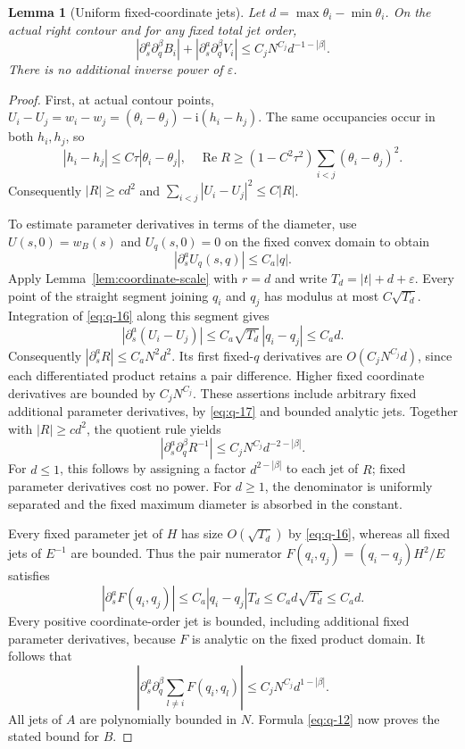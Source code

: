 \documentclass[11pt]{article}
\numberwithin{equation}{section}
\newtheorem{lemma}[theorem]{Lemma}
\theoremstyle{remark}\newtheorem{remark}[theorem]{Remark}
\newcommand{\ii}{\mathrm i}
\newcommand{\Rea}{\operatorname{Re}}
\begin{document}
\begin{lemma}[Uniform fixed-coordinate jets]\label{lem:jets}
Let $d=\max\theta_i-\min\theta_i$. On the actual right contour and
for any fixed total jet order,
\begin{equation}\label{eq:q-14}
|\partial_s^a\partial_q^\beta B_i|
  +|\partial_s^a\partial_q^\beta V_i|
 \le C_j N^{C_j}d^{-1-|\beta|}.
\end{equation}
There is no additional inverse power of $\varepsilon$.
\end{lemma}
\begin{proof}
First, at actual contour points,
$U_i-U_j=w_i-w_j=(\theta_i-\theta_j)-\ii(h_i-h_j)$.
The same occupancies occur in both $h_i,h_j$, so
\begin{equation}\label{eq:q-15}
|h_i-h_j|\le C\tau|\theta_i-\theta_j|,
 \quad \Rea R\ge(1-C^2\tau^2)\sum_{i<j}(\theta_i-\theta_j)^2.
\end{equation}
Consequently $|R|\ge c d^2$ and
$\sum_{i<j}|U_i-U_j|^2\le C|R|$.

To estimate parameter derivatives in terms of the diameter, use
$U(s,0)=w_B(s)$ and $U_q(s,0)=0$ on the fixed convex domain to obtain
\begin{equation}\label{eq:q-16}
 |\partial_s^a U_q(s,q)|\le C_a|q|.
\end{equation}
Apply Lemma~\ref{lem:coordinate-scale} with $r=d$ and write
$T_d=|t|+d+\varepsilon$. Every point of the straight segment
joining $q_i$ and $q_j$ has modulus at most $C\sqrt{T_d}$.
Integration of \eqref{eq:q-16} along this segment gives
\begin{equation}\label{eq:q-17}
 |\partial_s^a(U_i-U_j)|
 \le C_a\sqrt{T_d}\,|q_i-q_j|\le C_a d.
\end{equation}
Consequently $|\partial_s^aR|\le C_aN^2d^2$.
Its first fixed-$q$ derivatives are $O(C_jN^{C_j}d)$, since
each differentiated product retains a pair difference.
Higher fixed coordinate derivatives are bounded by $C_jN^{C_j}$.
These assertions include arbitrary fixed additional parameter
derivatives, by \eqref{eq:q-17} and bounded analytic jets.
Together with $|R|\ge cd^2$, the quotient rule yields
\[
 |\partial_s^a\partial_q^\beta R^{-1}|
       \le C_jN^{C_j}d^{-2-|\beta|}.
\]
For $d\le1$, this follows by assigning a factor
$d^{2-|\beta|}$ to each jet of $R$; fixed parameter derivatives
cost no power. For $d\ge1$, the denominator is uniformly
separated and the fixed maximum diameter is absorbed in the constant.

Every fixed parameter jet of $H$ has size $O(\sqrt{T_d})$ by
\eqref{eq:q-16}, whereas all fixed jets of $E^{-1}$ are bounded.
Thus the pair numerator $F(q_i,q_j)=(q_i-q_j)H^2/E$ satisfies
\[
 |\partial_s^aF(q_i,q_j)|
 \le C_a|q_i-q_j|T_d\le C_a d\sqrt{T_d}\le C_a d.
\]
Every positive coordinate-order jet is bounded, including
additional fixed parameter derivatives, because $F$ is analytic
on the fixed product domain. It follows that
\[
 |\partial_s^a\partial_q^\beta\sum_{l\ne i}F(q_i,q_l)|
       \le C_jN^{C_j}d^{1-|\beta|}.
\]
All jets of $A$ are polynomially bounded in $N$.
Formula \eqref{eq:q-12} now proves the stated bound for $B$.


\end{proof}
\end{document}
